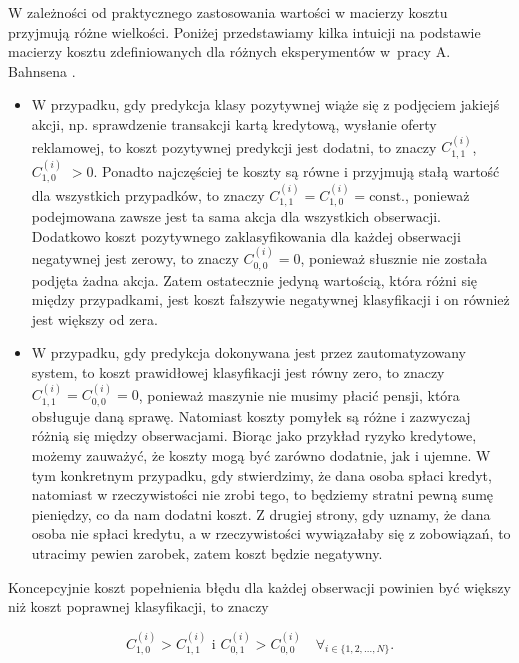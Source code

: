 \documentclass[inzynierska]{pwr_wmat_praca_dyplomowa}
\theoremstyle{plain}
\numberwithin{theorem}{chapter}
\theoremstyle{definition}
\numberwithin{theorem}{chapter}
\begin{document}
W zależności od praktycznego zastosowania wartości w macierzy kosztu przyjmują różne wielkości. Poniżej przedstawiamy kilka intuicji na podstawie macierzy kosztu zdefiniowanych dla różnych eksperymentów w~pracy A. Bahnsena \cite{alej2015ensemble}.
\begin{itemize}
	\item W przypadku, gdy predykcja klasy pozytywnej wiąże się z podjęciem jakiejś akcji, np. sprawdzenie transakcji kartą kredytową, wysłanie oferty reklamowej, to koszt pozytywnej predykcji jest dodatni, to znaczy $C^{(i)}_{1,1}$, $C^{(i)}_{1,0}$ $>0$. Ponadto najczęściej te koszty są równe i przyjmują stałą wartość dla wszystkich przypadków, to znaczy $C^{(i)}_{1,1} = C^{(i)}_{1,0} =  \text{const.}$, ponieważ podejmowana zawsze jest ta sama akcja dla wszystkich obserwacji. Dodatkowo koszt pozytywnego zaklasyfikowania dla każdej obserwacji negatywnej jest zerowy, to znaczy $C^{(i)}_{0,0} = 0$, ponieważ słusznie nie została podjęta żadna akcja. Zatem ostatecznie jedyną wartością, która różni się między przypadkami, jest koszt fałszywie negatywnej klasyfikacji i on również jest większy od zera.
	\item W przypadku, gdy predykcja dokonywana jest przez zautomatyzowany system, to koszt prawidłowej klasyfikacji jest równy zero, to znaczy $C^{(i)}_{1,1} = C^{(i)}_{0,0} = 0$, ponieważ maszynie nie musimy płacić pensji, która obsługuje daną sprawę. Natomiast koszty pomyłek są różne i zazwyczaj różnią się między obserwacjami. Biorąc jako przykład ryzyko kredytowe, możemy zauważyć, że koszty mogą być zarówno dodatnie, jak i ujemne. W tym konkretnym przypadku, gdy stwierdzimy, że dana osoba spłaci kredyt, natomiast w rzeczywistości nie zrobi tego, to będziemy stratni pewną sumę pieniędzy, co da nam dodatni koszt. Z drugiej strony, gdy uznamy, że dana osoba nie spłaci kredytu, a w rzeczywistości wywiązałaby się z zobowiązań, to utracimy pewien zarobek, zatem koszt będzie negatywny.
\end{itemize}

Koncepcyjnie koszt popełnienia błędu dla każdej obserwacji powinien być większy niż koszt poprawnej klasyfikacji, to znaczy

$$ C^{(i)}_{1,0} > C^{(i)}_{1,1} \text{ i } C^{(i)}_{0,1} > C^{(i)}_{0,0} \quad \forall_{i \in \{1, 2, \dots, N\}} \text{.}$$
\end{document}
